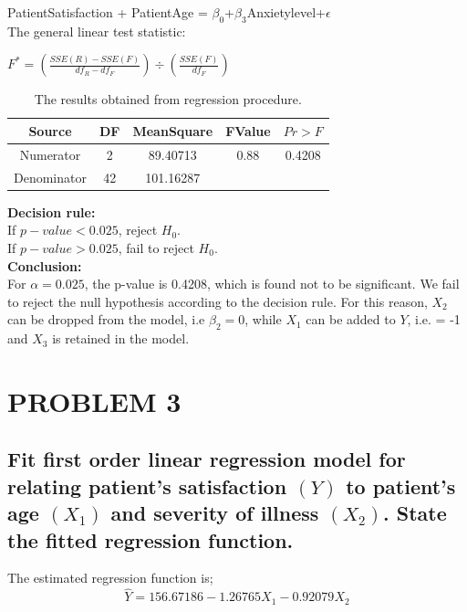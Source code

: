 \documentclass[a4paper,9pt]{article}\usepackage[]{graphicx}\usepackage[]{color}
\begin{document}
PatientSatisfaction + PatientAge = $\beta_0$+$\beta_3$Anxietylevel+$\epsilon$ \\

The general linear test statistic:
\begin{center}
$F^*=(\frac{SSE(R)-SSE(F)}{df_R-df_F})\div(\frac{SSE(F)}{df_F})$
\end{center}

\begin {table}[H]
\begin{center}
\caption {The results obtained from regression procedure.} 
\begin{tabular}{ccccc}\hline
 Source & DF & MeanSquare & FValue  & $Pr>F$  \\ \hline
 Numerator & 2  & 89.40713	  & 0.88	 & 0.4208\\
 Denominator & 42 & 101.16287	  &         &        \\ \hline
\end{tabular}
\end{center}
\end{table}

\newpage
\textbf{Decision rule:} \\

If $p-value<0.025$, reject $H_0$. \\
If $p-value>0.025$, fail to reject $H_0$.\\

\textbf {Conclusion:}\\

For $\alpha=0.025$, the p-value is 0.4208, which is found not to be significant. We fail to reject the null hypothesis according to the decision rule. For this reason, $X_2$ can be dropped from the model, i.e $\beta_2 = 0$, while  $X_1$ can be added to $Y$, i.e. = -1 and $X_3$ is retained in the model. 

\section*{PROBLEM 3}
\subsection*{Fit first order linear regression model for relating patient's satisfaction $(Y)$ to patient's age $(X_{1})$ and severity of illness $(X_{2})$. State the fitted regression function.}

The estimated regression function is; $$\hat{Y} = 156.67186 - 1.26765X_1 - 0.92079X_2$$
\end{document}
